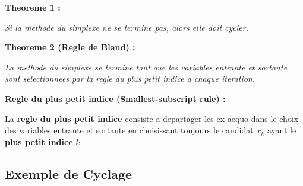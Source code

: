 \documentclass[12pt,a4paper]{article}
\begin{document}
\begin{theoreme}
\textbf{Theoreme 1 :}

\textit{Si la methode du simplexe ne se termine pas, alors elle doit cycler.}
\end{theoreme}

\begin{theoreme}
\textbf{Theoreme 2 (Regle de Bland) :}

\textit{La methode du simplexe se termine tant que les variables entrante et sortante sont selectionnees par la \textcolor{defvert}{regle du plus petit indice} a chaque iteration.}
\end{theoreme}

\begin{definition}
\textbf{Regle du plus petit indice (Smallest-subscript rule) :}

La \textcolor{titrebleu}{\textbf{regle du plus petit indice}} consiste a departager les ex-aequo dans le choix des variables entrante et sortante en choisissant toujours le candidat $x_k$ ayant le \textcolor{defvert}{\textbf{plus petit indice}} $k$.
\end{definition}

\newpage
\subsection{Exemple de Cyclage}
\end{document}
